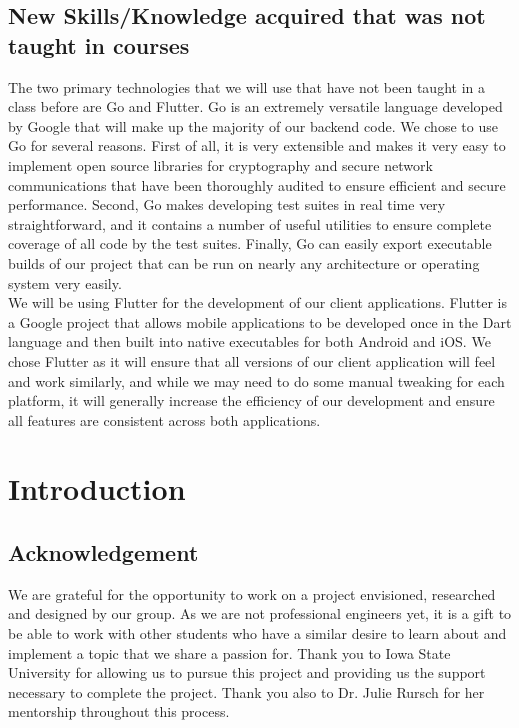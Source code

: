 \documentclass[11pt]{article}
\begin{document}
\subsection*{New Skills/Knowledge acquired that was not taught in courses}
The two primary technologies that we will use that have not been taught in a class before are Go and Flutter. Go is an extremely versatile language developed by Google that will make up the majority of our backend code. We chose to use Go for several reasons. First of all, it is very extensible and makes it very easy to implement open source libraries for cryptography and secure network communications that have been thoroughly audited to ensure efficient and secure performance. Second, Go makes developing test suites in real time very straightforward, and it contains a number of useful utilities to ensure complete coverage of all code by the test suites. Finally, Go can easily export executable builds of our project that can be run on nearly any architecture or operating system very easily. 
\\
We will be using Flutter for the development of our client applications. Flutter is a Google project that allows mobile applications to be developed once in the Dart language and then built into native executables for both Android and iOS. We chose Flutter as it will ensure that all versions of our client application will feel and work similarly, and while we may need to do some manual tweaking for each platform, it will generally increase the efficiency of our development and ensure all features are consistent across both applications.
\\

\newpage
\tableofcontents
\listoffigures
\listoftables
\newpage

\section{Introduction}
\subsection{Acknowledgement}
We are grateful for the opportunity to work on a project envisioned, researched and designed by our group. As we are not professional engineers yet, it is a gift to be able to work with other students who have a similar desire to learn about and implement a topic that we share a passion for. Thank you to Iowa State University for allowing us to pursue this project and providing us the support necessary to complete the project. Thank you also to Dr. Julie Rursch for her mentorship throughout this process. \\
\end{document}
